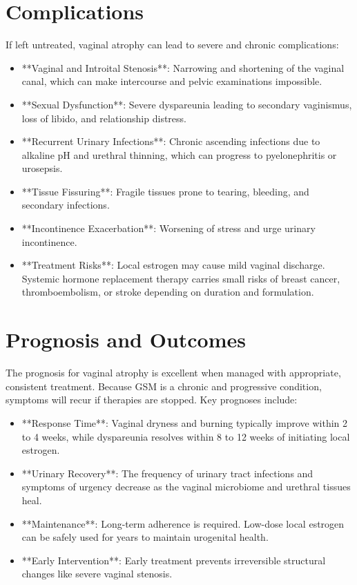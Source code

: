 \section*{Complications}
If left untreated, vaginal atrophy can lead to severe and chronic complications:
\begin{itemize}
\item **Vaginal and Introital Stenosis**: Narrowing and shortening of the vaginal canal, which can make intercourse and pelvic examinations impossible.
\item **Sexual Dysfunction**: Severe dyspareunia leading to secondary vaginismus, loss of libido, and relationship distress.
\item **Recurrent Urinary Infections**: Chronic ascending infections due to alkaline pH and urethral thinning, which can progress to pyelonephritis or urosepsis.
\item **Tissue Fissuring**: Fragile tissues prone to tearing, bleeding, and secondary infections.
\item **Incontinence Exacerbation**: Worsening of stress and urge urinary incontinence.
\item **Treatment Risks**: Local estrogen may cause mild vaginal discharge. Systemic hormone replacement therapy carries small risks of breast cancer, thromboembolism, or stroke depending on duration and formulation.
\end{itemize}

\section*{Prognosis and Outcomes}
The prognosis for vaginal atrophy is excellent when managed with appropriate, consistent treatment. Because GSM is a chronic and progressive condition, symptoms will recur if therapies are stopped.
Key prognoses include:
\begin{itemize}
\item **Response Time**: Vaginal dryness and burning typically improve within 2 to 4 weeks, while dyspareunia resolves within 8 to 12 weeks of initiating local estrogen.
\item **Urinary Recovery**: The frequency of urinary tract infections and symptoms of urgency decrease as the vaginal microbiome and urethral tissues heal.
\item **Maintenance**: Long-term adherence is required. Low-dose local estrogen can be safely used for years to maintain urogenital health.
\item **Early Intervention**: Early treatment prevents irreversible structural changes like severe vaginal stenosis.
\end{itemize}

